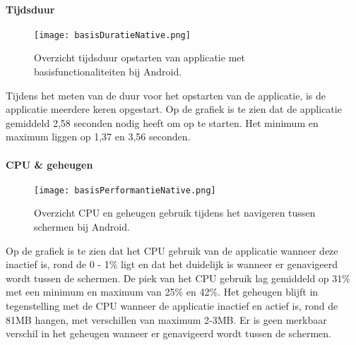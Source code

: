 \paragraph{Tijdsduur}
\begin{figure}[H]
    \centering
    \texttt{[image: basisDuratieNative.png]}
    \caption{Overzicht tijdsduur opstarten van applicatie met basisfunctionaliteiten bij Android.}
\end{figure}
Tijdens het meten van de duur voor het opstarten van de applicatie, 
is de applicatie meerdere keren opgestart. Op de grafiek is te zien dat de applicatie
gemiddeld 2,58 seconden nodig heeft om op te starten. Het minimum en maximum 
liggen op 1,37 en 3,56 seconden.

\paragraph{CPU \& geheugen}
\begin{figure}[H]
    \centering
    \texttt{[image: basisPerformantieNative.png]}
    \caption{Overzicht CPU en geheugen gebruik tijdens het navigeren tussen schermen bij Android.}
\end{figure}
Op de grafiek is te zien dat het CPU gebruik van de applicatie wanneer deze 
inactief is, rond de 0 - 1\% ligt en dat het duidelijk is wanneer er
genavigeerd wordt tussen de schermen. De piek van het CPU gebruik lag gemiddeld
op 31\% met een minimum en maximum van 25\% en 42\%. Het geheugen blijft in tegenstelling
met de CPU wanneer de applicatie inactief en actief is, rond de 81MB hangen, met
verschillen van maximum 2-3MB. Er is geen merkbaar verschil in het geheugen wanneer
er genavigeerd wordt tussen de schermen.

